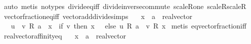 \begin{isabellebody}
%
\isadelimproof
%
\endisadelimproof
%
\isatagproof
{}\isamarkupfalse%
\ auto\ {\isacharparenleft}{\kern0pt}metis\ {\isacharparenleft}{\kern0pt}no{\isacharunderscore}{\kern0pt}types{\isacharparenright}{\kern0pt}\ divide{\isacharunderscore}{\kern0pt}eq{\isacharunderscore}{\kern0pt}{}{\isacharunderscore}{\kern0pt}iff\ divide{\isacharunderscore}{\kern0pt}inverse{\isacharunderscore}{\kern0pt}commute\ scaleR{\isacharunderscore}{\kern0pt}one\ scaleR{\isacharunderscore}{\kern0pt}scaleR{\isacharparenright}{\kern0pt}%
\endisatagproof
{\isafoldproof}%
%
\isadelimproof
\isanewline
%
\endisadelimproof
\isanewline
{}\isamarkupfalse%
\ vector{\isacharunderscore}{\kern0pt}fraction{\isacharunderscore}{\kern0pt}eq{\isacharunderscore}{\kern0pt}iff\ {\isacharbrackleft}{\kern0pt}vector{\isacharunderscore}{\kern0pt}add{\isacharunderscore}{\kern0pt}divide{\isacharunderscore}{\kern0pt}simps{\isacharbrackright}{\kern0pt}{\isacharcolon}{\kern0pt}\isanewline
\ \ \ x\ {\isacharcolon}{\kern0pt}{\isacharcolon}{\kern0pt}\ {\isachardoublequoteopen}{\isacharprime}{\kern0pt}a\ {\isacharcolon}{\kern0pt}{\isacharcolon}{\kern0pt}\ real{\isacharunderscore}{\kern0pt}vector{\isachardoublequoteclose}\isanewline
\ \ \ {\isachardoublequoteopen}{\isacharparenleft}{\kern0pt}{\isacharparenleft}{\kern0pt}u\ {\isacharslash}{\kern0pt}\ v{\isacharparenright}{\kern0pt}\ {\isacharasterisk}{\kern0pt}\isactrlsub R\ a\ {\isacharequal}{\kern0pt}\ x{\isacharparenright}{\kern0pt}\ {\isasymlongleftrightarrow}\ {\isacharparenleft}{\kern0pt}if\ v{\isacharequal}{\kern0pt}{}\ then\ x\ {\isacharequal}{\kern0pt}\ {}\ else\ u\ {\isacharasterisk}{\kern0pt}\isactrlsub R\ a\ {\isacharequal}{\kern0pt}\ v\ {\isacharasterisk}{\kern0pt}\isactrlsub R\ x{\isacharparenright}{\kern0pt}{\isachardoublequoteclose}\isanewline
%
\isadelimproof
%
\endisadelimproof
%
\isatagproof
{}\isamarkupfalse%
\ {\isacharparenleft}{\kern0pt}metis\ eq{\isacharunderscore}{\kern0pt}vector{\isacharunderscore}{\kern0pt}fraction{\isacharunderscore}{\kern0pt}iff{\isacharparenright}{\kern0pt}%
\endisatagproof
{\isafoldproof}%
%
\isadelimproof
\isanewline
%
\endisadelimproof
\isanewline
{}\isamarkupfalse%
\ real{\isacharunderscore}{\kern0pt}vector{\isacharunderscore}{\kern0pt}affinity{\isacharunderscore}{\kern0pt}eq{\isacharcolon}{\kern0pt}\isanewline
\ \ \ x\ {\isacharcolon}{\kern0pt}{\isacharcolon}{\kern0pt}\ {\isachardoublequoteopen}{\isacharprime}{\kern0pt}a\ {\isacharcolon}{\kern0pt}{\isacharcolon}{\kern0pt}\ real{\isacharunderscore}{\kern0pt}vector{\isachardoublequoteclose}\isanewline

\end{isabellebody}
